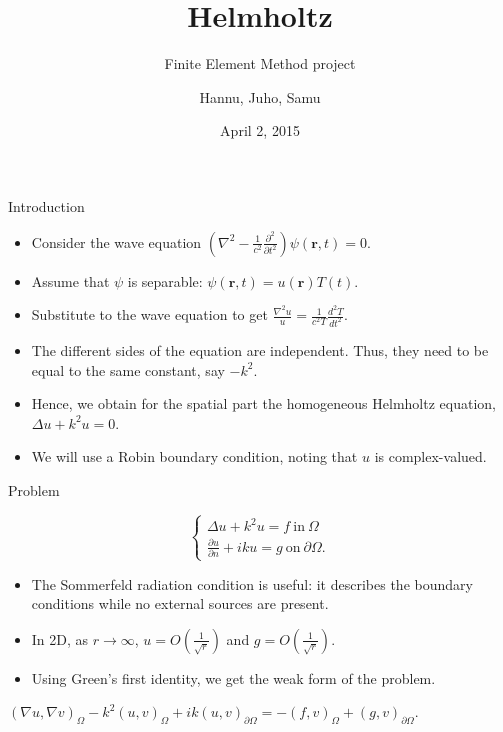 \documentclass{beamer}
\title[Helmholtz]{Helmholtz}
\subtitle{Finite Element Method project}
\author{Hannu, Juho, Samu}
\date{April 2, 2015}
\begin{document}
\begin{frame}
\titlepage
\end{frame}

\begin{frame}{Introduction}
\begin{itemize}
\item Consider the wave equation $(\nabla^2 - \frac{1}{c^2} \frac{\partial^2}{\partial t^2})\psi(\mathbf{r}, t) = 0$. 
\item Assume that $\psi$ is separable: $\psi(\mathbf{r}, t) = u(\mathbf{r})T(t)$. 
\item Substitute to the wave equation to get $\frac{\nabla^2 u}{u} = \frac{1}{c^2 T} \frac{d^2 T}{dt^2}$. 
\item The different sides of the equation are independent. Thus, they need to be equal to the same constant, say $-k^2$.
\item Hence, we obtain for the spatial part the homogeneous Helmholtz equation, $\Delta u + k^2 u = 0$.
\item We will use a Robin boundary condition, noting that $u$ is complex-valued.
\end{itemize}
\end{frame}


\begin{frame}{Problem}

\begin{definition}
\[ \begin{cases}
\Delta u + k^2 u = f \ \mathrm{in} \ \Omega \\ \frac{\partial u}{\partial n} + iku = g \ \mathrm{on} \ \partial \Omega.
\end{cases} \]
\end{definition}
\begin{itemize}
\item The Sommerfeld radiation condition is useful: it describes the boundary conditions while no external sources are present.
\item In 2D, as $r \rightarrow \infty$, $u = O(\frac{1}{\sqrt{r}})$ and $g = O(\frac{1}{\sqrt{r}})$. %
\item Using Green's first identity, we get the weak form of the problem.
\end{itemize}
\begin{definition}
$(\nabla u, \nabla v)_{\Omega} - k^2(u, v)_{\Omega} + ik(u, v)_{\partial \Omega} = -(f, v)_{\Omega} + (g, v)_{\partial \Omega}.$
\end{definition}
\end{frame}
\end{document}
